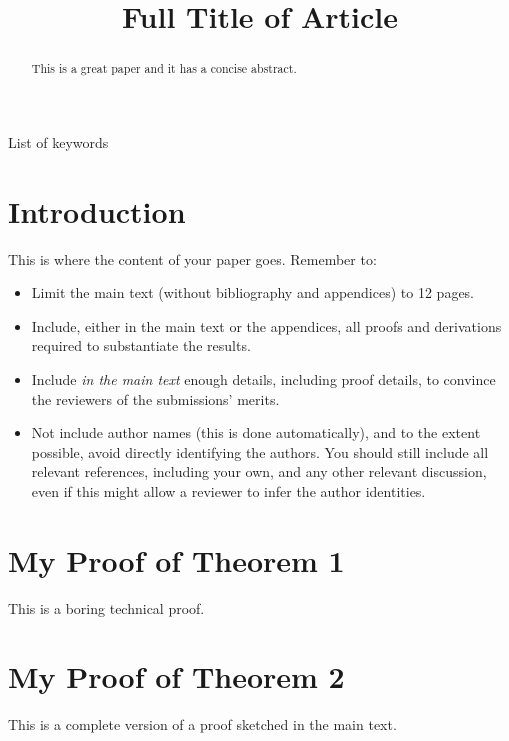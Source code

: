 \documentclass[anon,12pt]{colt2015} %
\title[Short Title]{Full Title of Article}
\begin{document}
\maketitle

\begin{abstract}
This is a great paper and it has a concise abstract.
\end{abstract}

\begin{keywords}
List of keywords
\end{keywords}

\section{Introduction}

This is where the content of your paper goes.  Remember to:
\begin{itemize}
\item Limit the main text (without bibliography and appendices) to 12 pages.
\item Include, either in the main text or the appendices, all proofs
  and derivations required to substantiate the results.
\item Include {\em in the main text} enough details, including proof
  details, to convince the reviewers of the submissions' merits.
\item Not include author names (this is done automatically), and to
  the extent possible, avoid directly identifying the authors.  You
  should still include all relevant references, including your own,
  and any other relevant discussion, even if this might allow a
  reviewer to infer the author identities.
\end{itemize}






\appendix

\section{My Proof of Theorem 1}

This is a boring technical proof.

\section{My Proof of Theorem 2}

This is a complete version of a proof sketched in the main text.
\end{document}
